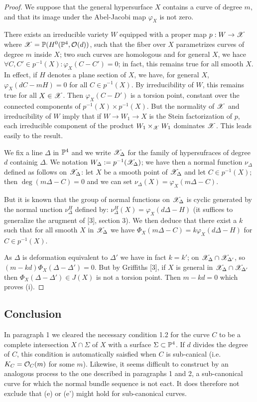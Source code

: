 \documentclass[12pt]{article}
\begin{document}
\begin{proof}
We suppose that the general hypersurface $X$ contains a curve of degree $m$, and that its image under the Abel-Jacobi map $\varphi_X$ is not zero.
\par 
There exists an irreducible variety $W$ equipped with a proper map $p : W \to \X$ where $\X = \P(H^0(\P^4, \struct{}(d))$, such that the fiber over $X$ parametrizes curves of degree $m$ inside $X$; two such curves are homologous and for general $X$, we hace $\forall C, C' \in p^{-1}(X) : \varphi_X(C - C') = 0$; in fact, this remains true for all smooth $X$. In effect, if $H$ denotes a plane section of $X$, we have, for general $X$, $\varphi_X(d C - m H) = 0$ for all $C \in p^{-1}(X)$. By irreducibility of $W$, this remains true for all $X \in \X$. Then $\varphi_X(C - D')$ is a torsion point, constant over the connected components of $p^{-1}(X) \times p^{-1}(X)$. But the normality of $\X$ and irreducibility of $W$ imply that if $W \to W_1 \to X$ is the Stein factorization of $p$, each irreducible component of the product $W_1 \times_{\X} W_1$ dominates $\X$. This leads easily to the result.  
\par 
We fix a line $\Delta$ in $\P^4$ and we write $\X_{\Delta}$ for the family of hypersufraces of degree $d$ containig $\Delta$. We notation $W_{\Delta} := p^{-1}(\X_{\Delta})$; we have then a normal function $\nu_{\Delta}$ defined as follows on $\X_{\Delta}$: let $X$ be a smooth point of $\X_{\Delta}$ and let $C \in p^{-1}(X)$; then $\deg{(m \Delta - C)} = 0$ and we can set $\nu_{\Delta}(X) = \varphi_X(m \Delta - C)$.
\par 
But it is known that the group of normal functions on $\X_{\Delta}$ is cyclic generated by the normal unction $\nu_\Delta^H$ defined by: $\nu_{\Delta}^H(X) = \varphi_X(d \Delta - H)$ (it suffices to generalize the arugment of [3], section 3). We then deduce that there exist a $k$ such that for all smooth $X$ in $\X_{\Delta}$ we have $\Phi_{X}(m \Delta - C) = k \varphi_X(d \Delta - H)$ for $C \in p^{-1}(X)$.
\par 
As $\Delta$ is deformation equivalent to $\Delta'$ we have in fact $k = k'$; on $\X_{\Delta} \cap \X_{\Delta'}$, so $(m -kd) \Phi_X(\Delta - \Delta') = 0$. But by Griffiths [3], if $X$ is general in $\X_{\Delta} \cap \X_{\Delta'}$ then $\Phi_{X}(\Delta - \Delta') \in J(X)$ is not a torsion point. Then $m - kd = 0$ which proves (i).
\end{proof}

\subsection{Conclusion}

In paragraph 1 we cleared the necessary condition 1.2 for the curve $C$ to be a complete intersection $X \cap \Sigma$ of $X$ with a surface $\Sigma \subset \P^4$. If $d$ divides the degree of $C$, this condition is automatically saisfied when $C$ is sub-canical (i.e. $K_C = \struct{C}(m)$ for some $m$). Likewise, it seems difficult to construct by an analogous process to the one described in paragraphs 1 and 2, a sub-canonical curve for which the normal bundle sequence is not eact. It does therefore not exclude that (e) or (e') might hold for sub-canonical curves.
\end{document}
